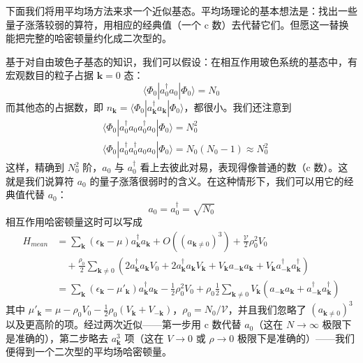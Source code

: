 下面我们将用平均场方法来求一个近似基态。平均场理论的基本想法是：找出一些量子涨落较弱的算符，用相应的经典值（一个 c 数）去代替它们。但愿这一替换能把完整的哈密顿量约化成二次型的。

基于对自由玻色子基态的知识，我们可以假设：在相互作用玻色系统的基态中，有宏观数目的粒子占据 $\pmb{k}=0$ 态：
\begin{equation*}
\langle\Phi_0|a_0^{\dagger}a_0|\Phi_0\rangle=N_0
\end{equation*}
而其他态的占据数，即 $n_{\pmb{k}}=\langle\Phi_0|a_{\pmb{k}}^{\dagger}a_{\pmb{k}}|\Phi_0\rangle$，都很小。我们还注意到
\begin{align*}
&\langle\Phi_0|a_0^{\dagger}a_0a_0^{\dagger}a_0|\Phi_0\rangle=N_0^2\\
&\langle\Phi_0|a_0^{\dagger}a_0^{\dagger}a_0a_0|\Phi_0\rangle=N_0(N_0-1)\approx N_0^2
\end{align*}
这样，精确到 $N_0^2$ 阶，$a_0$ 与 $a_0^{\dagger}$ 看上去彼此对易，表现得像普通的数（c 数）。这就是我们说算符 $a_0$ 的量子涨落很弱时的含义。在这种情形下，我们可以用它的经典值代替 $a_0$：
\begin{equation*}
a_0=a_0^{\dagger}=\sqrt{N_0}
\end{equation*}
相互作用哈密顿量这时可以写成
\begin{align*}
H_{mean}&=\sum_{\pmb{k}}(\epsilon_{\pmb{k}}-\mu)a_{\pmb{k}}^{\dagger}a_{\pmb{k}}+O\left((a_{\pmb{k}\neq0})^3\right)+\frac{\mathcal{V}}{2}\rho_0^2V_0\\
&\quad+\frac{\rho_0}{2}\sum_{\pmb{k}\neq0}\left(2a_{\pmb{k}}^{\dagger}a_{\pmb{k}}V_0+2a_{\pmb{k}}^{\dagger}a_{\pmb{k}}V_{\pmb{k}}+V_{\pmb{k}}a_{-\pmb{k}}a_{\pmb{k}}+V_{\pmb{k}}a_{-\pmb{k}}^{\dagger}a_{\pmb{k}}^{\dagger}\right)\\
&=\sum_{\pmb{k}}(\epsilon_{\pmb{k}}-\mu'_{\pmb{k}})a_{\pmb{k}}^{\dagger}a_{\pmb{k}}-\frac{1}{2}\rho_0^2V_0+\rho_0\frac{1}{2}\sum_{\pmb{k}\neq0}V_{\pmb{k}}\left(a_{-\pmb{k}}a_{\pmb{k}}+a_{-\pmb{k}}^{\dagger}a_{\pmb{k}}^{\dagger}\right)\tag{3.2.2}
\end{align*}
其中 $\mu'_{\pmb{k}}=\mu-\rho_0V_0-\frac{1}{2}\rho_0(V_{\pmb{k}}+V_{-\pmb{k}})$，$\rho_0=N_0/\mathcal{V}$，并且我们忽略了 $(a_{\pmb{k}\neq0})^3$ 以及更高阶的项。经过两次近似——第一步用 c 数代替 $a_0$（这在 $N\to\infty$ 极限下是准确的），第二步略去 $a_{\pmb{k}}^3$ 项（这在 $V\to0$ 或 $\rho\to0$ 极限下是准确的）——我们便得到一个二次型的平均场哈密顿量。

